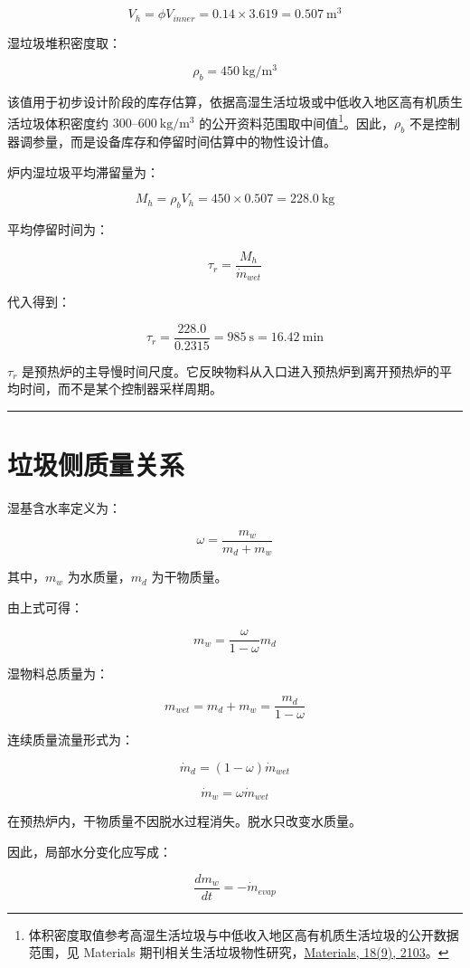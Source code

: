 \documentclass[UTF8,openany,zihao=-4,oneside]{ctexbook}
\newcommand{\manualdivider}{\par\vspace{0.6em}\noindent\textcolor{FGLine}{\rule{\linewidth}{0.7pt}}\vspace{0.6em}\par}
\begin{document}
\[
V_h=\phi V_{inner}=0.14\times3.619=0.507\ \mathrm{m^3}
\]

湿垃圾堆积密度取：

\[
\rho_b=450\ \mathrm{kg/m^3}
\]

该值用于初步设计阶段的库存估算，依据高湿生活垃圾或中低收入地区高有机质生活垃圾体积密度约 \(300\text{--}600\ \mathrm{kg/m^3}\) 的公开资料范围取中间值\footnote{体积密度取值参考高湿生活垃圾与中低收入地区高有机质生活垃圾的公开数据范围，见 Materials 期刊相关生活垃圾物性研究，\href{https://www.mdpi.com/1996-1944/18/9/2103}{Materials, 18(9), 2103}。}。因此，\(\rho_b\) 不是控制器调参量，而是设备库存和停留时间估算中的物性设计值。

炉内湿垃圾平均滞留量为：

\[
M_h=\rho_bV_h=450\times0.507=228.0\ \mathrm{kg}
\]

平均停留时间为：

\[
\tau_r=\frac{M_h}{\dot m_{wet}}
\]

代入得到：

\[
\tau_r=\frac{228.0}{0.2315}=985\ \mathrm{s}=16.42\ \mathrm{min}
\]

\(\tau_r\) 是预热炉的主导慢时间尺度。它反映物料从入口进入预热炉到离开预热炉的平均时间，而不是某个控制器采样周期。

\manualdivider

\section{垃圾侧质量关系}\label{ux5783ux573eux4fa7ux8d28ux91cfux5173ux7cfb}

湿基含水率定义为：

\[
\omega=\frac{m_w}{m_d+m_w}
\]

其中，\(m_w\) 为水质量，\(m_d\) 为干物质量。

由上式可得：

\[
m_w=\frac{\omega}{1-\omega}m_d
\]

湿物料总质量为：

\[
m_{wet}=m_d+m_w=\frac{m_d}{1-\omega}
\]

连续质量流量形式为：

\[
\dot m_d=(1-\omega)\dot m_{wet}
\]

\[
\dot m_w=\omega\dot m_{wet}
\]

在预热炉内，干物质量不因脱水过程消失。脱水只改变水质量。

因此，局部水分变化应写成：

\[
\frac{d m_w}{dt}=-\dot m_{evap}
\]
\end{document}
